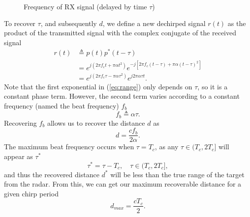 \begin{figure}[h]
	\centering
	\caption{Frequency of RX signal (delayed by time $\tau$)}
	\label{fig:single-target}
\end{figure}

To recover $\tau$, and subsequently $d$, we define a new dechirped signal $r(t)$
as the product of the transmitted signal with the complex conjugate of the
received signal
\begin{align}
	r(t) &\triangleq p(t)p^*(t-\tau) \\
	&= e^{j(2\pi f_c t + \pi \alpha t^2)}e^{-j[2\pi f_c (t-\tau) + \pi\alpha (t-\tau)^2 ]} \\
	&= e^{j(2\pi f_c \tau - \pi \alpha \tau^2)}e^{j2\pi\alpha\tau t}.\label{eq:range}
\end{align}
Note that the first exponential in (\ref{eq:range}) only depends on $\tau$, so it is
a constant phase term. However, the second term varies according to a constant
frequency (named the beat frequency) $f_b$
\begin{equation}
	f_b \triangleq \alpha \tau.
\end{equation}
Recovering $f_b$ allows us to recover the distance $d$ as
\begin{equation}
	\label{eq:distance}
	d = \frac{c f_b}{2\alpha}.
\end{equation}
The maximum beat frequency occurs when $\tau = T_c$, as any $\tau \in (T_c, 2T_c]$ will
appear as $\tau^*$
\begin{equation}
	\tau^* = \tau - T_c, \quad \tau \in (T_c, 2T_c],
\end{equation}
and thus the recovered distance $d^*$ will be less than the true range 
of the target from the radar. From this, we can get our maximum recoverable distance
for a given chirp period
\begin{equation}
	d_{max} = \frac{c T_c}{2}.
\end{equation}


